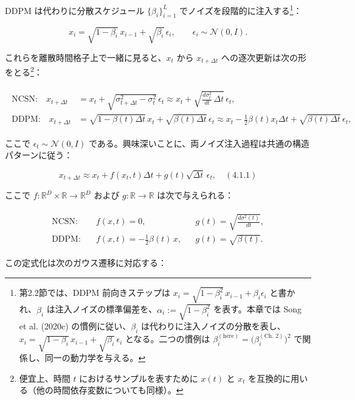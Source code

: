 DDPM は代わりに分散スケジュール $\{\beta_i\}_{i=1}^{L}$ でノイズを段階的に注入する\footnote{第2.2節では、DDPM 前向きステップは $x_i=\sqrt{1-\beta_i^2}\,x_{i-1}+\beta_i\epsilon_i$ と書かれ、$\beta_i$ は注入ノイズの標準偏差を、$\alpha_i:=\sqrt{1-\beta_i^2}$ を表す。本章では Song et al. (2020c) の慣例に従い、$\beta_i$ は代わりに注入ノイズの分散を表し、$x_i=\sqrt{1-\beta_i}\,x_{i-1}+\sqrt{\beta_i}\,\epsilon_i$ となる。二つの慣例は $\beta_i^{(\text{here})}=\bigl(\beta_i^{(\text{Ch.\ 2})}\bigr)^2$ で関係し、同一の動力学を与える。}：

\[
x_i = \sqrt{1-\beta_i}\, x_{i-1} + \sqrt{\beta_i}\,\epsilon_i, \qquad \epsilon_i\sim\mathcal{N}(0,I).
\]


これらを離散時間格子上で一緒に見ると、$x_t$ から $x_{t+\Delta t}$ への逐次更新は次の形をとる\footnote{便宜上、時間 $t$ におけるサンプルを表すために $x(t)$ と $x_t$ を互換的に用いる（他の時間依存変数についても同様）。}：

\begin{align*}
\begin{aligned}
\text{NCSN:}\quad
x_{t+\Delta t}
&= x_t + \sqrt{\sigma_{t+\Delta t}^2-\sigma_t^2}\,\epsilon_t
\approx x_t + \sqrt{\frac{d\sigma_t^2}{dt}\,\Delta t}\,\epsilon_t, \\
\text{DDPM:}\quad
x_{t+\Delta t}
&= \sqrt{1-\beta(t)\Delta t}\, x_t + \sqrt{\beta(t)\Delta t}\,\epsilon_t
\approx x_t - \tfrac12\beta(t)x_t\Delta t + \sqrt{\beta(t)\Delta t}\,\epsilon_t,
\end{aligned}
\end{align*}


ここで $\epsilon_t\sim\mathcal{N}(0,I)$ である。興味深いことに、両ノイズ注入過程は共通の構造パターンに従う：

\[
x_{t+\Delta t} \approx x_t + f(x_t,t)\Delta t + g(t)\sqrt{\Delta t}\,\epsilon_t, \quad (4.1.1)
\]


ここで $f:\mathbb{R}^D\times\mathbb{R}\to\mathbb{R}^D$ および $g:\mathbb{R}\to\mathbb{R}$ は次で与えられる：

\begin{align*}
\begin{aligned}
\text{NCSN:}&\quad f(x,t)=0, && g(t)=\sqrt{\frac{d\sigma^2(t)}{dt}}, \\
\text{DDPM:}&\quad f(x,t)=-\tfrac12\beta(t)\,x, && g(t)=\sqrt{\beta(t)}.
\end{aligned}
\end{align*}


この定式化は次のガウス遷移に対応する：

